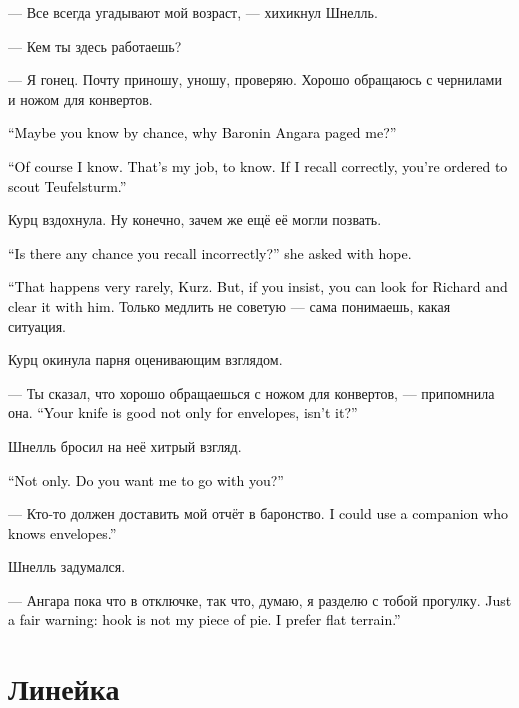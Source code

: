 \documentclass[a4paper,10pt,fleqn]{book}\usepackage{polyglossia}\setdefaultlanguage{english}\setotherlanguage{russian}\defaultfontfeatures{Ligatures=TeX,Mapping=tex-text}\usepackage{xcolor}\definecolor{lightgray}{HTML}{bbbbbb}\color{lightgray}\newcommand{\ml}[3]{\textcolor{black}{#3}}
\begin{document}
--- Все всегда угадывают мой возраст, --- хихикнул Шнелль.

--- Кем ты здесь работаешь?

--- Я гонец.
Почту приношу, уношу, проверяю.
Хорошо обращаюсь с чернилами и ножом для конвертов.

\ml{$0$}
{--- Может быть, ты случайно знаешь, зачем баронин Ангара меня вызвала?}
{``Maybe you know by chance, why Baronin Angara paged me?''}

\ml{$0$}
{--- Знаю, конечно.}
{``Of course I know.}
\ml{$0$}
{Профессия у меня такая --- знать.}
{That's my job, to know.}
\ml{$0$}
{Если мне не изменяет память, тебя отправляют на разведку к Тойфельстурм.}
{If I recall correctly, you're ordered to scout Teufelsturm.''}

Курц вздохнула.
Ну конечно, зачем же ещё её могли позвать.

\ml{$0$}
{--- А если память тебе изменяет? --- с надеждой спросила она.}
{``Is there any chance you recall incorrectly?'' she asked with hope.}

\ml{$0$}
{--- Редко она мне изменяет, Курц.}
{``That happens very rarely, Kurz.}
\ml{$0$}
{Но, если хочешь, можешь поискать Рихарда и уточнить у него.}
{But, if you insist, you can look for Richard and clear it with him.}
Только медлить не советую --- сама понимаешь, какая ситуация.

Курц окинула парня оценивающим взглядом.

--- Ты сказал, что хорошо обращаешься с ножом для конвертов, --- припомнила она.
\ml{$0$}
{--- Ты ведь не только конверты режешь?}
{``Your knife is good not only for envelopes, isn't it?''}

Шнелль бросил на неё хитрый взгляд.

\ml{$0$}
{--- Не только.}
{``Not only.}
\ml{$0$}
{Ты хочешь взять меня с собой?}
{Do you want me to go with you?''}

--- Кто-то должен доставить мой отчёт в баронство.
\ml{$0$}
{Мне бы не помешал спутник, знающий толк в конвертах.}
{I could use a companion who knows envelopes.''}

Шнелль задумался.

--- Ангара пока что в отключке, так что, думаю, я разделю с тобой прогулку.
\ml{$0$}
{Только хочу предупредить: хук --- это не моё.}
{Just a fair warning: hook is not my piece of pie.}
\ml{$0$}
{Предпочитаю равнинную местность.}
{I prefer flat terrain.''}

\section{Линейка}
\end{document}
